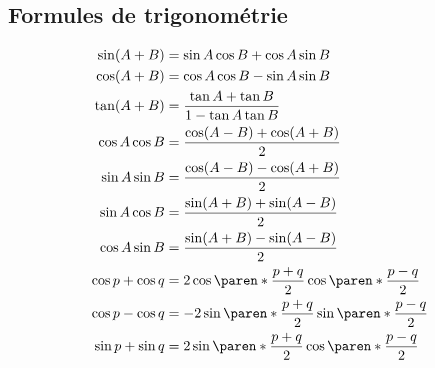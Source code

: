 \documentclass[french,xcolor=svgnames]{beamer}
\begin{document}
\subsection{Formules de trigonométrie}
\begin{frame}%
  \vspace{-3.ex}
  \begin{align*}
    \sin (A + B)      & = \sin A \cos B + \cos A \sin B                                                      \\
    \cos (A + B)      & = \cos A \cos B - \sin A \sin B                                                      \\
    \tan (A + B)      & = \frac{\tan A + \tan B}{1 - \tan A \tan B}                                          \\
    \cos A \cos B     & =\frac{\cos(A-B)+\cos(A+B)}2\\
    \sin A \sin B     & =\frac{\cos(A-B)-\cos(A+B)}2\\
    \sin A \cos B     & =\frac{\sin(A+B)+\sin(A-B)}2                                                        \\
    \cos A \sin B     & =\frac{\sin(A+B)-\sin(A-B)}2                                                         \\
    \cos p + \cos q   & = 2 \cos \paren*{ \frac{p+q} 2 } \cos \paren*{ \frac{p-q} 2 }                        \\
    \cos p - \cos q   & = -2 \sin \paren*{ \frac{p+q} 2 } \sin \paren*{ \frac{p-q} 2 }                       \\
    \sin p + \sin q   & = 2 \sin \paren*{ \frac{p+q} 2 } \cos \paren*{ \frac{p-q} 2 }
  \end{align*}
\end{frame}
\end{document}
